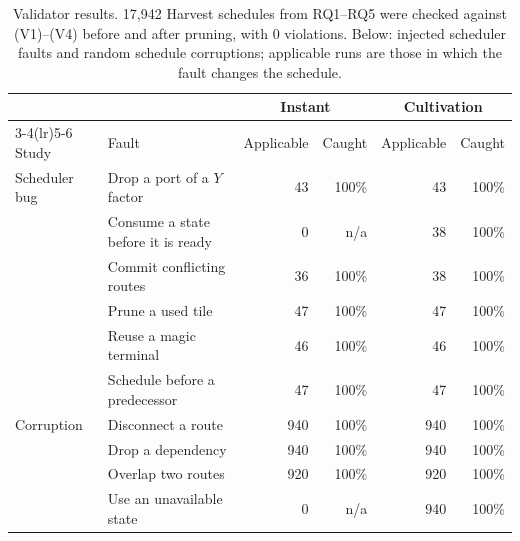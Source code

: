 \begin{table}[t]
\centering\small
\caption{Validator results. 17,942 Harvest schedules from RQ1--RQ5 were checked against (V1)--(V4) before and after pruning, with 0 violations. Below: injected scheduler faults and random schedule corruptions; applicable runs are those in which the fault changes the schedule.}
\label{tab:validity}
\begin{tabular}{ll rr rr}
\toprule
 & & \multicolumn{2}{c}{Instant} & \multicolumn{2}{c}{Cultivation} \\
\cmidrule(lr){3-4}\cmidrule(lr){5-6}
Study & Fault & Applicable & Caught & Applicable & Caught \\
\midrule
Scheduler bug & Drop a port of a $Y$ factor & 43 & 100\% & 43 & 100\% \\
 & Consume a state before it is ready & 0 & n/a & 38 & 100\% \\
 & Commit conflicting routes & 36 & 100\% & 38 & 100\% \\
 & Prune a used tile & 47 & 100\% & 47 & 100\% \\
 & Reuse a magic terminal & 46 & 100\% & 46 & 100\% \\
 & Schedule before a predecessor & 47 & 100\% & 47 & 100\% \\
\midrule
Corruption & Disconnect a route & 940 & 100\% & 940 & 100\% \\
 & Drop a dependency & 940 & 100\% & 940 & 100\% \\
 & Overlap two routes & 920 & 100\% & 920 & 100\% \\
 & Use an unavailable state & 0 & n/a & 940 & 100\% \\
\bottomrule
\end{tabular}
\end{table}
